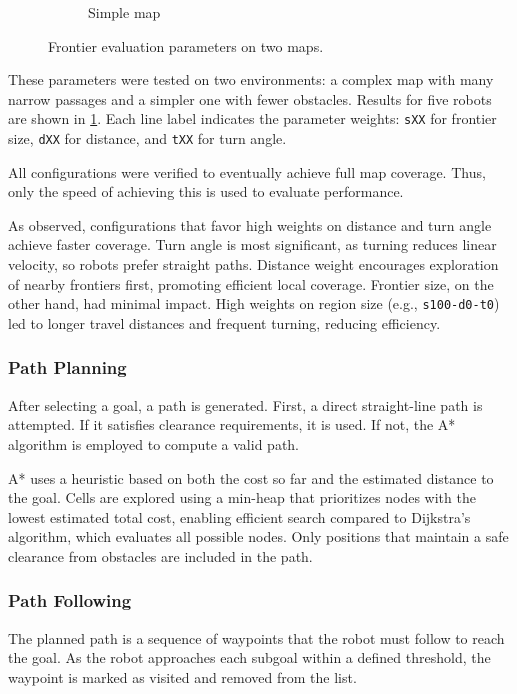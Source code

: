 \begin{figure}[H]
\begin{subfigure}[b]{0.45\textwidth}
        \caption{Simple map}
    \end{subfigure}
    \caption{Frontier evaluation parameters on two maps.}
    \label{fig:frontier-eval-params}
\end{figure}

These parameters were tested on two environments: a complex map with many narrow passages and a simpler one with fewer obstacles. Results for five robots are shown in \cref{fig:frontier-eval-params}. Each line label indicates the parameter weights: 
\texttt{sXX} for frontier size, \texttt{dXX} for distance, and \texttt{tXX} for turn angle.

All configurations were verified to eventually achieve full map coverage. Thus, only the speed of achieving this is used to evaluate performance.

As observed, configurations that favor high weights on distance and turn angle achieve faster coverage.
Turn angle is most significant, as turning reduces linear velocity, so robots prefer straight paths.
Distance weight encourages exploration of nearby frontiers first, promoting efficient local coverage.
Frontier size, on the other hand, had minimal impact. High weights on region size (e.g., \texttt{s100-d0-t0}) led to longer travel distances and frequent turning, reducing efficiency.

\subsubsection{Path Planning}\label{sec:path_planning}
After selecting a goal, a path is generated. First, a direct straight-line path is attempted. If it satisfies clearance requirements, it is used.
If not, the A* algorithm is employed to compute a valid path.

A* uses a heuristic based on both the cost so far and the estimated distance to the goal.
Cells are explored using a min-heap that prioritizes nodes with the lowest estimated total cost, enabling efficient search compared to Dijkstra’s algorithm, which evaluates all possible nodes.
Only positions that maintain a safe clearance from obstacles are included in the path.

\subsubsection{Path Following}\label{sec:path_following}
The planned path is a sequence of waypoints that the robot must follow to reach the goal.
As the robot approaches each subgoal within a defined threshold, the waypoint is marked as visited and removed from the list.

